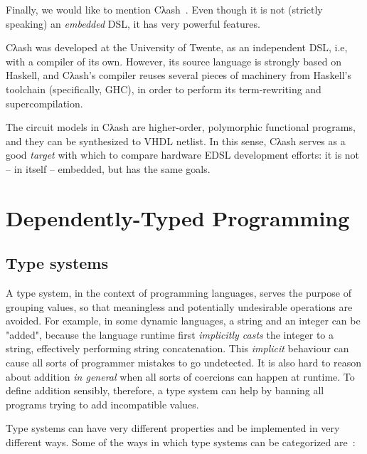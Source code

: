             Finally, we would like to mention Cλash~\cite{clash-baaij}.
            Even though it is not (strictly speaking) an \emph{embedded} \ac{DSL},
            it has very powerful features.

            Cλash was developed at the University of Twente,
            as an independent \ac{DSL}, i.e, with a compiler of its own.
            However, its source language is strongly based on Haskell, and Cλash's compiler
            reuses several pieces of machinery from Haskell's toolchain (specifically, GHC),
            in order to perform its term-rewriting and supercompilation.

            The circuit models in Cλash are higher-order, polymorphic functional programs,
            and they can be synthesized to \ac{VHDL} netlist.
            In this sense, Cλash serves as a good \emph{target} with which to compare hardware
            \ac{EDSL} development efforts: it is not – in itself – embedded, but has the same goals.


    \section{Dependently-Typed Programming}
    \label{sec:dtp}

        \subsection{Type systems}
        \label{subsec:type-systems}
            A type system, in the context of programming languages,
            serves the purpose of grouping values, so that meaningless and potentially undesirable operations are avoided.
            For example, in some dynamic languages, a string and an integer can be "added",
            because the language runtime first \emph{implicitly casts} the integer to a string,
            effectively performing string concatenation.
            This \emph{implicit} behaviour can cause all sorts of programmer mistakes to go undetected.
            It is also hard to reason about addition \emph{in general} when all sorts
            of coercions can happen at runtime.
            To define addition sensibly, therefore, a type system can help by
            banning all programs trying to add incompatible values.

            Type systems can have very different properties and be implemented in very different ways.
            Some of the ways in which type systems can be categorized are~\cite{understanding-types-cardelli}:

